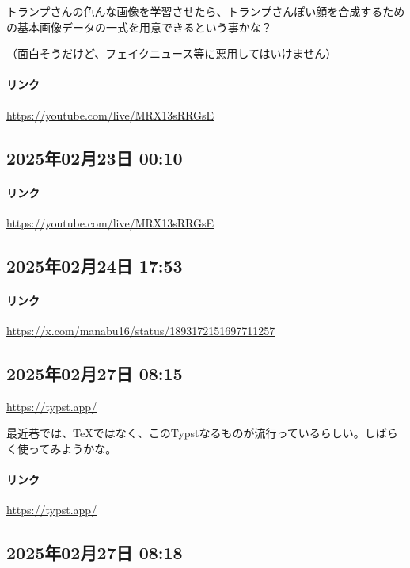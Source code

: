 トランプさんの色んな画像を学習させたら、トランプさんぽい顔を合成するための基本画像データの一式を用意できるという事かな？

（面白そうだけど、フェイクニュース等に悪用してはいけません）

\paragraph{リンク}
\url{https://youtube.com/live/MRX13sRRGsE}

\subsection*{2025年02月23日 00:10}

\paragraph{リンク}
\url{https://youtube.com/live/MRX13sRRGsE}

\subsection*{2025年02月24日 17:53}

\paragraph{リンク}
\url{https://x.com/manabu16/status/1893172151697711257}

\subsection*{2025年02月27日 08:15}

\url{https://typst.app/}

最近巷では、TeXではなく、このTypstなるものが流行っているらしい。しばらく使ってみようかな。

\paragraph{リンク}
\url{https://typst.app/}

\subsection*{2025年02月27日 08:18}

